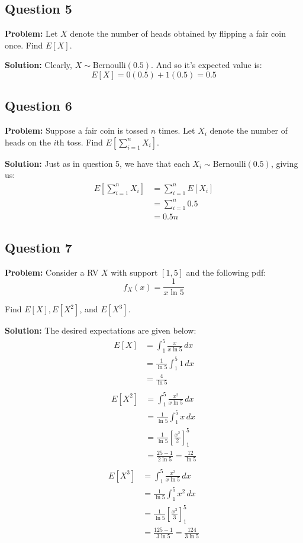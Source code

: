 \documentclass{article}
\newcommand*\eval[3]{\left[#1\right]_{#2}^{#3}}
\begin{document}
\subsection*{Question 5}
\noindent\textbf{Problem:} Let $X$ denote the number of heads obtained by flipping a fair coin once. Find $E[X]$.
\bigskip

\noindent\textbf{Solution:} Clearly, $X\sim\text{Bernoulli}(0.5)$. And so it's expected value is:
\smallskip
$$E[X]=0(0.5)+1(0.5)=\boxed{0.5}$$

\smallskip

\subsection*{Question 6}
\noindent\textbf{Problem:} Suppose a fair coin is tossed $n$ times. Let $X_i$ denote the number of heads on the $i$th toss. Find $E\left[\sum_{i=1}^n X_i\right]$.
\bigskip

\noindent\textbf{Solution:} Just as in question 5, we have that each $X_i\sim\text{Bernoulli}(0.5)$, giving us:
\begin{align*}
  E\left[\sum_{i=1}^n X_i\right]&=\sum_{i=1}^n E[X_i]\tag{linarity of expectation}\\
  &=\sum_{i=1}^n 0.5\tag{mean of Bernoulli distribution}\\
  &=\boxed{0.5n}
\end{align*}
\smallskip

\subsection*{Question 7}
\noindent\textbf{Problem:} Consider a RV $X$ with support $[1,5]$ and the following pdf:
$$f_X(x)=\frac{1}{x\ln 5}$$

Find $E[X], E[X^2]$, and $E[X^3]$.
\bigskip

\noindent\textbf{Solution:} The desired expectations are given below:
\begin{align*}
  E[X]&=\int_1^5\frac{x}{x\ln 5}\,dx\\
  &=\frac{1}{\ln 5}\int_1^5 1\,dx\\
  &=\boxed{\frac{4}{\ln 5}}\\
\end{align*}
\begin{align*}
  E[X^2]&=\int_1^5\frac{x^2}{x\ln 5}\,dx\\
  &=\frac{1}{\ln 5}\int_1^5x\,dx\\
  &=\frac{1}{\ln 5}\eval{\frac{x^2}{2}}{1}{5}\\
  &=\frac{25-1}{2\ln 5}=\boxed{\frac{12}{\ln 5}}\\
\end{align*}
\begin{align*}
  E[X^3]&=\int_1^5\frac{x^3}{x\ln 5}\,dx\\
  &=\frac{1}{\ln 5}\int_1^5x^2\,dx\\
  &=\frac{1}{\ln 5}\eval{\frac{x^3}{3}}{1}{5}\\
  &=\frac{125-1}{3\ln 5}=\boxed{\frac{124}{3\ln 5}}\\
\end{align*}
\smallskip
\end{document}
